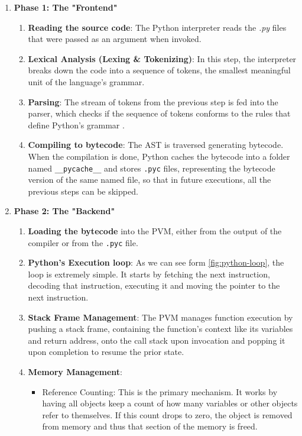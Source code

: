 \begin{enumerate}
    \item \textbf{Phase 1: The "Frontend"} 
    \begin{enumerate}
        \item \textbf{Reading the source code}: The Python interpreter reads the \textit{.py} files that were passed as an argument when invoked.
        \item \textbf{Lexical Analysis (Lexing \& Tokenizing)}: In this step, the interpreter breaks down the code into a sequence of tokens, the smallest meaningful unit of the language's grammar.
        \item \textbf{Parsing}: The stream of tokens from the previous step is fed into the parser, which checks if the sequence of tokens conforms to the rules that define Python's grammar \cite{python_grammar_ref}.
        \item \textbf{Compiling to \gls{bytecode}}: The \gls{AST} is traversed generating \gls{bytecode}. When the compilation is done, Python caches the bytecode into a folder named \texttt{\_\_pycache\_\_} and stores \texttt{.pyc} files, representing the \gls{bytecode} version of the same named file, so that in future executions, all the previous steps can be skipped.
    \end{enumerate}
    \item \textbf{Phase 2: The "Backend"} 
    \begin{enumerate}
        \item \textbf{Loading the \gls{bytecode}} into the \gls{PVM}, either from the output of the compiler or from the \texttt{.pyc} file.
        \item \textbf{Python's Execution loop}: As we can see form \autoref{fig:python-loop}, the loop is extremely simple. It starts by fetching the next instruction, decoding that instruction, executing it and moving the pointer to the next instruction.
        \item \textbf{Stack Frame Management}: The \gls{PVM} manages function execution by pushing a stack frame, containing the function's context like its variables and return address, onto the call stack upon invocation and popping it upon completion to resume the prior state.
        \item \textbf{Memory Management}:
        \begin{itemize}
            \item Reference Counting: This is the primary mechanism. It works by having all objects keep a count of how many variables or other objects refer to themselves. If this count drops to zero, the object is removed from memory and thus that section of the memory is freed.

\end{itemize}
\end{enumerate}
\end{enumerate}
